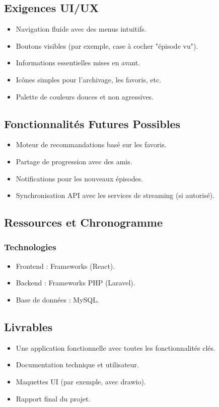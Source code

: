 \subsection{Exigences UI/UX}
\begin{itemize}
    \item Navigation fluide avec des menus intuitifs.
    \item Boutons visibles (par exemple, case à cocher "épisode vu").
    \item Informations essentielles mises en avant.
    \item Icônes simples pour l'archivage, les favoris, etc.
    \item Palette de couleurs douces et non agressives.
\end{itemize}

\subsection{Fonctionnalités Futures Possibles}
\begin{itemize}
    \item Moteur de recommandations basé sur les favoris.
    \item Partage de progression avec des amis.
    \item Notifications pour les nouveaux épisodes.
    \item Synchronisation API avec les services de streaming (si autorisé).
\end{itemize}

\subsection{Ressources et Chronogramme}

\subsubsection{Technologies}
\begin{itemize}
    \item Frontend : Frameworks (React).
    \item Backend : Frameworks PHP (Laravel).
    \item Base de données : MySQL.
\end{itemize}

\subsection{Livrables}
\begin{itemize}
    \item Une application fonctionnelle avec toutes les fonctionnalités clés.
    \item Documentation technique et utilisateur.
    \item Maquettes UI (par exemple, avec drawio).
    \item Rapport final du projet.
\end{itemize}
